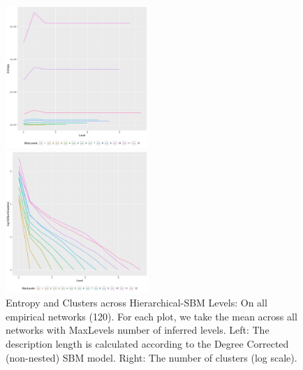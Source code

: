 \documentclass[aps,pre,superscriptaddress]{revtex4}
\begin{document}
\begin{figure}
	\centering
	\begin{subfloat}
		\centering
		\includegraphics[width=0.48\textwidth]{fig1.pdf}
	\end{subfloat}
	\begin{subfloat}
		\centering
		\includegraphics[width=0.48\textwidth]{fig2.pdf}
	\end{subfloat}
	\caption{Entropy and Clusters across Hierarchical-SBM Levels:
		On all empirical networks (120).
		For each plot, we take the mean across all networks with MaxLevels number of inferred levels.
		Left: The description length is calculated according to the Degree Corrected (non-nested) SBM model.
		Right: The number of clusters (log scale).
	}
	\label{figs:fig1}
\end{figure}
\end{document}
